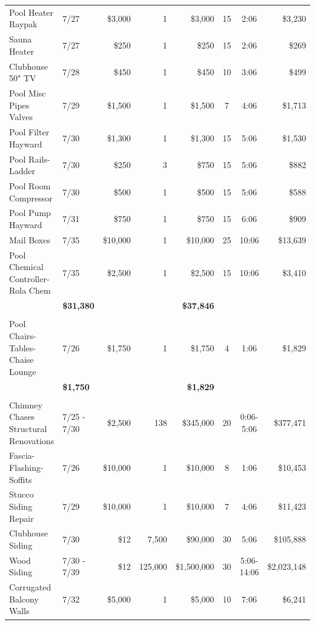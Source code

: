 \documentclass[11pt,letterpaper]{article}
\begin{document}
\begin{longtable}{p{4.2cm} p{1.6cm} r r r c c r}
Pool Heater Raypak & 7/27 & \$3,000 & 1 & \$3,000 & 15 & 2:06 & \$3,230 \\
\rowcolor{blue!12} Sauna Heater & 7/27 & \$250 & 1 & \$250 & 15 & 2:06 & \$269 \\
Clubhouse 50" TV & 7/28 & \$450 & 1 & \$450 & 10 & 3:06 & \$499 \\
\rowcolor{blue!12} Pool Misc Pipes Valves & 7/29 & \$1,500 & 1 & \$1,500 & 7 & 4:06 & \$1,713 \\
Pool Filter Hayward & 7/30 & \$1,300 & 1 & \$1,300 & 15 & 5:06 & \$1,530 \\
\rowcolor{blue!12} Pool Rails-Ladder & 7/30 & \$250 & 3 & \$750 & 15 & 5:06 & \$882 \\
Pool Room Compressor & 7/30 & \$500 & 1 & \$500 & 15 & 5:06 & \$588 \\
\rowcolor{blue!12} Pool Pump Hayward & 7/31 & \$750 & 1 & \$750 & 15 & 6:06 & \$909 \\
Mail Boxes & 7/35 & \$10,000 & 1 & \$10,000 & 25 & 10:06 & \$13,639 \\
\rowcolor{blue!12} Pool Chemical Controller-Rola Chem & 7/35 & \$2,500 & 1 & \$2,500 & 15 & 10:06 & \$3,410 \\
\addlinespace[1pt] \multicolumn{4}{r}{} & \textbf{\$31,380} & & & \textbf{\$37,846} \\
\addlinespace[6pt]
\multicolumn{8}{l}{\textbf{Exterior Furniture}} \\
Pool Chairs-Tables-Chaise Lounge & 7/26 & \$1,750 & 1 & \$1,750 & 4 & 1:06 & \$1,829 \\
\addlinespace[1pt] \multicolumn{4}{r}{} & \textbf{\$1,750} & & & \textbf{\$1,829} \\
\addlinespace[6pt]
\multicolumn{8}{l}{\textbf{Exterior Surfaces}} \\
\rowcolor{blue!12} Chimney Chases Structural Renovations & 7/25 - 7/30 & \$2,500 & 138 & \$345,000 & 20 & 0:06-5:06 & \$377,471 \\
Fascia-Flashing-Soffits & 7/26 & \$10,000 & 1 & \$10,000 & 8 & 1:06 & \$10,453 \\
\rowcolor{blue!12} Stucco Siding Repair & 7/29 & \$10,000 & 1 & \$10,000 & 7 & 4:06 & \$11,423 \\
Clubhouse Siding & 7/30 & \$12 & 7,500 & \$90,000 & 30 & 5:06 & \$105,888 \\
\rowcolor{blue!12} Wood Siding & 7/30 - 7/39 & \$12 & 125,000 & \$1,500,000 & 30 & 5:06-14:06 & \$2,023,148 \\
Corrugated Balcony Walls & 7/32 & \$5,000 & 1 & \$5,000 & 10 & 7:06 & \$6,241 \\

\end{longtable}
\end{document}

